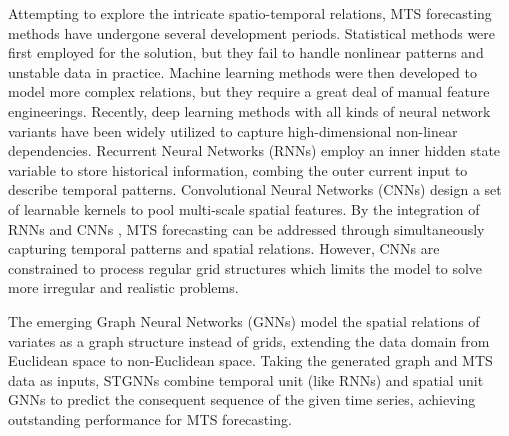 \documentclass[final,12pt]{elsarticle}
\begin{document}
Attempting to explore the intricate spatio-temporal relations, 
MTS forecasting methods have undergone several development periods.  %
Statistical methods 
\cite{box1976analysis}\cite{drucker1996support}\cite{zivot2006vector}\cite{chen2007narx}\cite{frigola2015bayesian} 
were first employed for the solution, 
but they fail to handle nonlinear patterns and unstable data in practice.  %
Machine learning methods 
\cite{breiman2001random}\cite{regression1992introduction}\cite{zhang2003time} 
were then developed to model more complex relations, 
but they require a great deal of manual feature engineerings.  %
Recently, deep learning methods with all kinds of neural network variants 
have been widely utilized 
to capture high-dimensional non-linear dependencies.  %
Recurrent Neural Networks (RNNs) \cite{graves2012long}\cite{cho2014learning} 
employ an inner hidden state variable to store historical information, 
combing the outer current input to describe temporal patterns.  %
Convolutional Neural Networks (CNNs) \cite{lecun2002gradient} 
design a set of learnable kernels to pool multi-scale spatial features.  %
By the integration of RNNs and CNNs \cite{lai2018modeling}\cite{shih2019temporal}, 
MTS forecasting can be addressed 
through simultaneously capturing temporal patterns and spatial relations.  %
However, CNNs are constrained to process regular grid structures 
which limits the model to solve more irregular and realistic problems.  %

The emerging Graph Neural Networks (GNNs) 
\cite{bruna2013spectral}\cite{defferrard2016convolutional}\cite{kipf2016semi} 
model the spatial relations of variates as a graph structure instead of grids, 
extending the data domain from Euclidean space to non-Euclidean space.  %
Taking the generated graph and MTS data as inputs, 
STGNNs \cite{jin2023spatio}\cite{corradini2024systematic} 
combine temporal unit (like RNNs) and spatial unit GNNs 
to predict the consequent sequence of the given time series, 
achieving outstanding performance for MTS forecasting.  %
\end{document}
